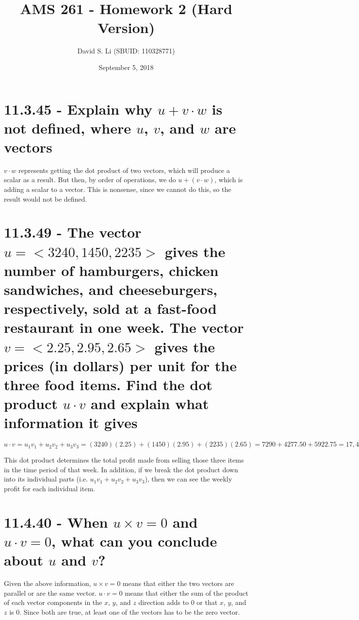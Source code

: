 \documentclass{article}
\title{AMS 261 - Homework 2 (Hard Version)}
\author{David S. Li (SBUID: 110328771)}
\date{September 5, 2018}
\begin{document}
\maketitle

\section{11.3.45 - Explain why $u + v \cdot w$ is not defined, where $u$, $v$, and $w$ are vectors}

\par\noindent \Large{$v \cdot w$ represents getting the dot product of two vectors, which will produce a scalar as a result.  But then, by order of operations, we do $u + (v \cdot w)$, which is adding a scalar to a vector.  This is nonsense, since we cannot do this, so the result would not be defined.}

\par\vspace{0.25cm}

\section{11.3.49 - The vector $u = <3240, 1450, 2235>$ gives the number of hamburgers, chicken sandwiches, and cheeseburgers, respectively, sold at a fast-food restaurant in one week.  The vector $v = <2.25, 2.95, 2.65>$ gives the prices (in dollars) per unit for the three food items.  Find the dot product $u \cdot v$ and explain what information it gives}

\par\noindent $u \cdot v = u_1v_1 + u_2v_2 + u_3v_3 = (3240)(2.25) + (1450)(2.95) + (2235)(2.65) = 7290 + 4277.50 + 5922.75 = 17,490.25$

\par\vspace{0.25cm}\noindent This dot product determines the total profit made from selling those three items in the time period of that week.  In addition, if we break the dot product down into its individual parts (i.e. $u_1v_1 + u_2v_2 + u_3v_3$), then we can see the weekly profit for each individual item.

\section{11.4.40 - When $u \times v = 0$ and $u \cdot v = 0$, what can you conclude about $u$ and $v$?}

\par\noindent Given the above information, $u \times v = 0$ means that either the two vectors are parallel or are the same vector.  $u \cdot v = 0$ means that either the sum of the product of each vector components in the $x$, $y$, and $z$ direction adds to 0 or that $x$, $y$, and $z$ is 0.  Since both are true, at least one of the vectors has to be the zero vector.
\end{document}
